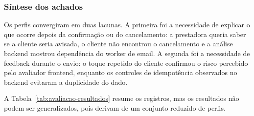 \subsubsection{Síntese dos achados}

Os perfis convergiram em duas lacunas. A primeira foi a necessidade de explicar o que ocorre depois da confirmação ou do cancelamento: a prestadora queria saber se a cliente seria avisada, o cliente não encontrou o cancelamento e a análise backend mostrou dependência do worker de email. A segunda foi a necessidade de feedback durante o envio: o toque repetido do cliente confirmou o risco percebido pelo avaliador frontend, enquanto os controles de idempotência observados no backend evitaram a duplicidade do dado.

A Tabela~\ref{tab:avaliacao-resultados} resume os registros, mas os resultados não podem ser generalizados, pois derivam de um conjunto reduzido de perfis.
